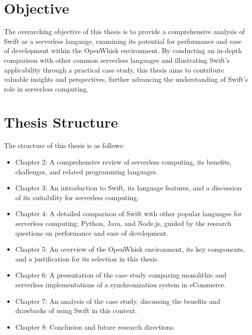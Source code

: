 \section{Objective}

The overarching objective of this thesis is to provide a comprehensive analysis of Swift as a serverless language, examining its potential for performance and ease of development within the OpenWhisk environment. By conducting an in-depth comparison with other common serverless languages and illustrating Swift's applicability through a practical case study, this thesis aims to contribute valuable insights and perspectives, further advancing the understanding of Swift's role in serverless computing.

\section{Thesis Structure}

The structure of this thesis is as follows:
\begin{itemize}
    \item Chapter 2: A comprehensive review of serverless computing, its benefits, challenges, and related programming languages.
    \item Chapter 3: An introduction to Swift, its language features, and a discussion of its suitability for serverless computing.
    \item Chapter 4: A detailed comparison of Swift with other popular languages for serverless computing: Python, Java, and Node.js, guided by the research questions on performance and ease of development.
    \item Chapter 5: An overview of the OpenWhisk environment, its key components, and a justification for its selection in this thesis.
    \item Chapter 6: A presentation of the case study comparing monolithic and serverless implementations of a synchronization system in eCommerce.
    \item Chapter 7: An analysis of the case study, discussing the benefits and drawbacks of using Swift in this context.
    \item Chapter 8: Conclusion and future research directions.
\end{itemize}